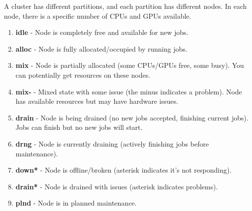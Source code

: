   A cluster has different partitions, and each partition has different nodes. In each node, there is a specific number of CPUs and GPUs available. 

  \begin{enumerate}
    \item \textbf{idle} - Node is completely free and available for new jobs.
    \item \textbf{alloc} - Node is fully allocated/occupied by running jobs.
    \item \textbf{mix} - Node is partially allocated (some CPUs/GPUs free, some busy). You can potentially get resources on these nodes.
    \item \textbf{mix-} - Mixed state with some issue (the minus indicates a problem). Node has available resources but may have hardware issues.
    \item \textbf{drain} - Node is being drained (no new jobs accepted, finishing current jobs). Jobs can finish but no new jobs will start.
    \item \textbf{drng} - Node is currently draining (actively finishing jobs before maintenance).
    \item \textbf{down*} - Node is offline/broken (asterisk indicates it's not responding).
    \item \textbf{drain*} - Node is drained with issues (asterisk indicates problems).
    \item \textbf{plnd} - Node is in planned maintenance.
  \end{enumerate}

